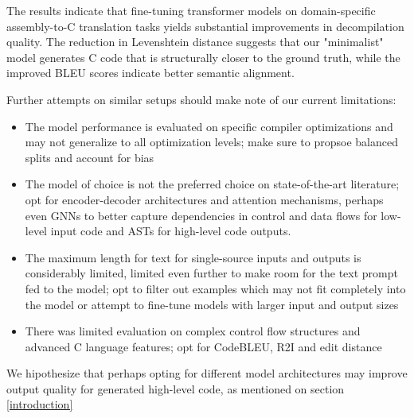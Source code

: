 \documentclass[../main.tex]{subfiles}
\begin{document}
The results indicate that fine-tuning transformer models on domain-specific 
assembly-to-C translation tasks yields substantial improvements in decompilation
quality. 
The reduction in Levenshtein distance suggests that our "minimalist" model generates
C code  that is structurally closer to the ground truth, while the improved BLEU
scores indicate better semantic alignment.

Further attempts on similar setups should make note of our current limitations:
\begin{itemize}
\item The model performance is evaluated on specific compiler optimizations and
may not generalize to all optimization levels; make sure to propsoe balanced 
splits and account for bias
\item The model of choice is not the preferred choice on state-of-the-art literature;
opt for encoder-decoder architectures and attention mechanisms, perhaps even GNNs
to better capture dependencies in control and data flows for low-level input code 
and ASTs for high-level code outputs. 
\item The maximum length for text for single-source inputs and outputs is considerably
limited, limited even further to make room for the text prompt fed to the model;
opt to filter out examples which may not fit completely into the model or attempt
to fine-tune models with larger input and output sizes
\item There was limited evaluation on complex control flow structures and advanced C 
language features; opt for CodeBLEU, R2I and edit distance
\end{itemize}

We hipothesize that perhaps opting for different model architectures may improve
output quality for generated high-level code, as mentioned on section \ref{introduction} 
\end{document}
